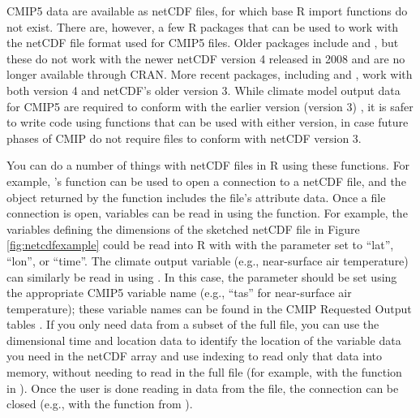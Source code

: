 CMIP5 data are available as netCDF files, for which base R import
functions do not exist. There are, however, a few R packages that can be
used to work with the netCDF file format used for CMIP5 files. Older
packages include  and , but these do not work with
the newer netCDF version 4 released in 2008 and are no longer available
through CRAN. More recent packages, including  \citep{ncdf4}
and  \citep{michna2013rnetcdf, RNetCDF}, work with both
version 4 and netCDF's older version 3. While climate model output data
for CMIP5 are required to conform with the earlier version (version 3)
\citep{taylor2010cmip5}, it is safer to write code using functions that
can be used with either version, in case future phases of CMIP do not
require files to conform with netCDF version 3.

You can do a number of things with netCDF files in R using these
functions. For example, 's  function can be
used to open a connection to a netCDF file, and the object returned by
the function includes the file's attribute data. Once a file connection
is open, variables can be read in using the  function.
For example, the variables defining the dimensions of the sketched
netCDF file in Figure \ref{fig:netcdfexample} could be read into R with
 with the  parameter set to ``lat'',
``lon'', or ``time''. The climate output variable (e.g., near-surface
air temperature) can similarly be read in using . In
this case, the  parameter should be set using the
appropriate CMIP5 variable name (e.g., ``tas'' for near-surface air
temperature); these variable names can be found in the CMIP Requested
Output tables \citep{taylor2010cmip5}. If you only need data from a
subset of the full file, you can use the dimensional time and location
data to identify the location of the variable data you need in the
netCDF array and use indexing to read only that data into memory,
without needing to read in the full file (for example, with the
 function in ). Once
the user is done reading in data from the file, the connection can be
closed (e.g., with the  function from ).

